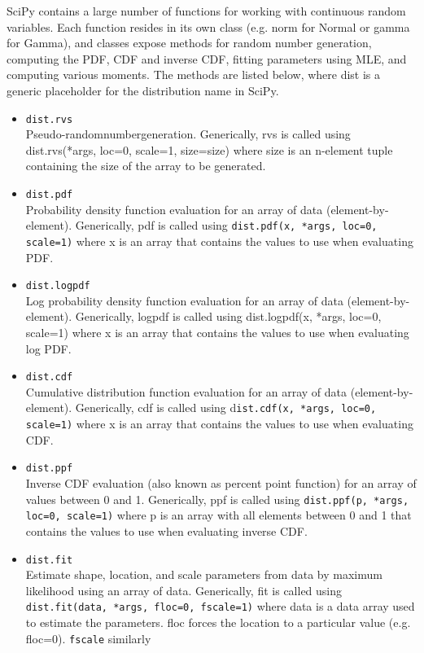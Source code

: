 \documentclass[KSmain.tex]{subfiles}
\begin{document}
SciPy contains a large number of functions for working with continuous random variables. Each function
resides in its own class (e.g. norm for Normal or gamma for Gamma), and classes expose methods for random
number generation, computing the PDF, CDF and inverse CDF, fitting parameters using MLE, and
computing various moments. The methods are listed below, where dist is a generic placeholder for the
distribution name in SciPy. 
\begin{itemize} 
	\item \texttt{dist.rvs}\\
	Pseudo-randomnumbergeneration. Generically, rvs is called using dist.rvs(*args, loc=0, scale=1, size=size)
	where size is an n-element tuple containing the size of the array to be generated.
	\item \texttt{dist.pdf}\\
	Probability density function evaluation for an array of data (element-by-element). Generically, pdf is
	called using \texttt{dist.pdf(x, *args, loc=0, scale=1)} where x is an array that contains the values to use when
	evaluating PDF.
	\item \texttt{dist.logpdf}\\
	Log probability density function evaluation for an array of data (element-by-element). Generically, logpdf
	is called using dist.logpdf(x, *args, loc=0, scale=1) where x is an array that contains the values to use
	when evaluating log PDF.
	\item \texttt{dist.cdf}\\
	Cumulative distribution function evaluation for an array of data (element-by-element). Generically, cdf
	is called using d\texttt{ist.cdf(x, *args, loc=0, scale=1)} where x is an array that contains the values to use
	when evaluating CDF.
	\item \texttt{dist.ppf}\\
	Inverse CDF evaluation (also known as percent point function) for an array of values between 0 and 1.
	Generically, ppf is called using \texttt{dist.ppf(p, *args, loc=0, scale=1)} where p is an array with all elements
	between 0 and 1 that contains the values to use when evaluating inverse CDF.
	\item \texttt{dist.fit}\\
	Estimate shape, location, and scale parameters from data by maximum likelihood using an array of data.
	Generically, fit is called using \texttt{dist.fit(data, *args, floc=0, fscale=1)} where data is a data array used
	to estimate the parameters. floc forces the location to a particular value (e.g. floc=0). \texttt{fscale} similarly

\end{itemize}
\end{document}
